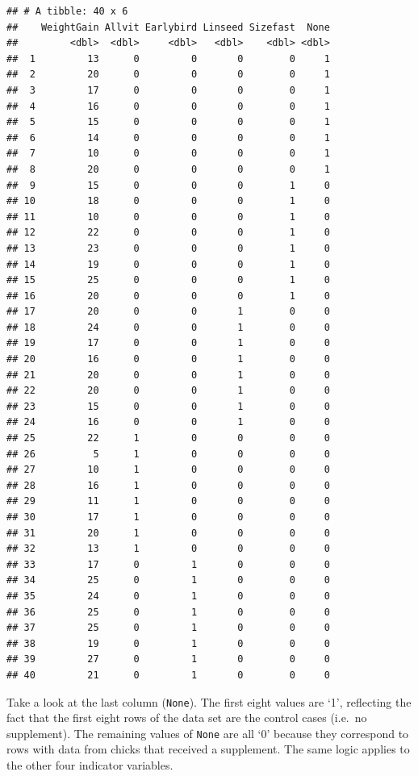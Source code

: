\documentclass[
]{book}
\begin{document}
\begin{verbatim}
## # A tibble: 40 x 6
##    WeightGain Allvit Earlybird Linseed Sizefast  None
##         <dbl>  <dbl>     <dbl>   <dbl>    <dbl> <dbl>
##  1         13      0         0       0        0     1
##  2         20      0         0       0        0     1
##  3         17      0         0       0        0     1
##  4         16      0         0       0        0     1
##  5         15      0         0       0        0     1
##  6         14      0         0       0        0     1
##  7         10      0         0       0        0     1
##  8         20      0         0       0        0     1
##  9         15      0         0       0        1     0
## 10         18      0         0       0        1     0
## 11         10      0         0       0        1     0
## 12         22      0         0       0        1     0
## 13         23      0         0       0        1     0
## 14         19      0         0       0        1     0
## 15         25      0         0       0        1     0
## 16         20      0         0       0        1     0
## 17         20      0         0       1        0     0
## 18         24      0         0       1        0     0
## 19         17      0         0       1        0     0
## 20         16      0         0       1        0     0
## 21         20      0         0       1        0     0
## 22         20      0         0       1        0     0
## 23         15      0         0       1        0     0
## 24         16      0         0       1        0     0
## 25         22      1         0       0        0     0
## 26          5      1         0       0        0     0
## 27         10      1         0       0        0     0
## 28         16      1         0       0        0     0
## 29         11      1         0       0        0     0
## 30         17      1         0       0        0     0
## 31         20      1         0       0        0     0
## 32         13      1         0       0        0     0
## 33         17      0         1       0        0     0
## 34         25      0         1       0        0     0
## 35         24      0         1       0        0     0
## 36         25      0         1       0        0     0
## 37         25      0         1       0        0     0
## 38         19      0         1       0        0     0
## 39         27      0         1       0        0     0
## 40         21      0         1       0        0     0
\end{verbatim}

Take a look at the last column (\texttt{None}). The first eight values are `1', reflecting the fact that the first eight rows of the data set are the control cases (i.e.~no supplement). The remaining values of \texttt{None} are all `0' because they correspond to rows with data from chicks that received a supplement. The same logic applies to the other four indicator variables.
\end{document}

